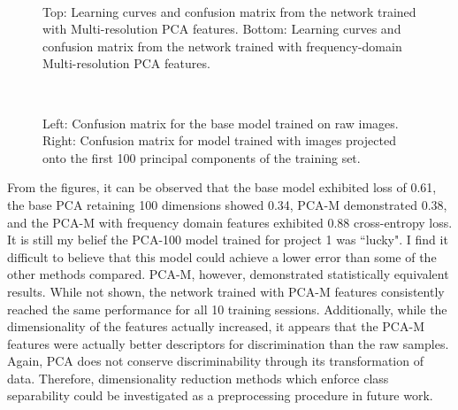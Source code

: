 \documentclass{article}[12 pt]
\begin{document}
\begin{figure}[h]
	\centering
	\quad
	\\
	\quad
	\caption{Top: Learning curves and confusion matrix from the network trained with Multi-resolution PCA features.  Bottom: Learning curves and confusion matrix from the network trained with frequency-domain Multi-resolution PCA features.}
	\label{fig:pcam_confusion_mats}
\end{figure}

\begin{figure}[h]
	\centering
	\quad
	\\
	\caption{Left: Confusion matrix for the base model trained on raw images. Right: Confusion matrix for model trained with images projected onto the first 100 principal components of the training set.}
	\label{fig:base_confusion_mats}
\end{figure}

\noindent
From the figures, it can be observed that the base model exhibited loss of 0.61, the base PCA retaining 100 dimensions showed 0.34, PCA-M demonstrated 0.38, and the PCA-M with frequency domain features exhibited 0.88 cross-entropy loss.  It is still my belief the PCA-100 model trained for project 1 was ``lucky".  I find it difficult to believe that this model could achieve a lower error than some of the other methods compared.  PCA-M, however, demonstrated statistically equivalent results.  While not shown, the network trained with PCA-M features consistently reached the same performance for all 10 training sessions.  Additionally, while the dimensionality of the features actually increased, it appears that the PCA-M features were actually better descriptors for discrimination than the raw samples. \\

\noindent
Again, PCA does not conserve discriminability through its transformation of data.  Therefore, dimensionality reduction methods which enforce class separability could be investigated as a preprocessing procedure in future work. 

\noindent

 
\end{document}
